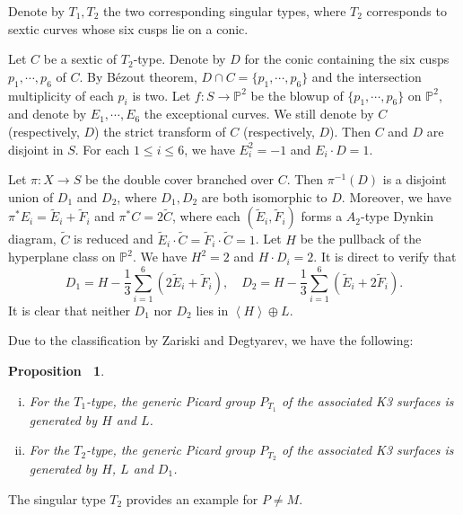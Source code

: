 \documentclass[12pt,reqno,a4paper]{amsart}
\newtheorem{prop}[thm]{Proposition~}
\theoremstyle{remark}
\theoremstyle{definition}
\begin{document}
Denote by $T_1,T_2$ the two corresponding singular types, where $T_2$ corresponds to sextic curves whose six cusps lie on a conic.

Let $C$ be a sextic of $T_2$-type.
Denote by $D$ for the conic containing the six cusps $p_1,\cdots,p_6$ of $C$.
By B\'ezout theorem, $D\cap C = \{ p_1,\cdots,p_6 \}$ and the intersection multiplicity of each $p_i$ is two.
Let $f\colon S\to \mathbb{P}^2$ be the blowup of $\{ p_1,\cdots,p_6 \}$ on $\mathbb{P}^2$, and denote by $E_1,\cdots,E_6$ the exceptional curves.
We still denote by $C$ (respectively, $D$) the strict transform of $C$ (respectively, $D$).
Then $C$ and $D$ are disjoint in $S$.
For each $1\le i\le 6$, we have $E_i^2=-1$ and $E_i\cdot D=1$.

Let $\pi\colon X\to S$ be the double cover branched over $C$.
Then $\pi^{-1}(D)$ is a disjoint union of $D_1$ and $D_2$, where $D_1,D_2$ are both isomorphic to $D$.
Moreover, we have $\pi^* E_i = \widetilde{E}_i + \widetilde{F}_i$ and $\pi^* C = 2 \widetilde{C}$, where each $(\widetilde{E}_i,\widetilde{F}_i)$ forms a $A_2$-type Dynkin diagram, $\widetilde{C}$ is reduced and $\widetilde{E}_i\cdot \widetilde{C} = \widetilde{F}_i\cdot \widetilde{C} = 1$.
Let $H$ be the pullback of the hyperplane class on $\mathbb{P}^2$.
We have $H^2=2$ and $H\cdot D_i=2$.
It is direct to verify that 
\begin{equation*}
    D_1 = H - \frac{1}{3}\sum_{i=1}^6 (2 \widetilde{E}_i + \widetilde{F}_i),\quad D_2 = H - \frac{1}{3}\sum_{i=1}^6 (\widetilde{E}_i + 2 \widetilde{F}_i).
\end{equation*}
It is clear that neither $D_1$ nor $D_2$ lies in $\left\langle H\right\rangle \oplus L$.

Due to the classification by Zariski and Degtyarev, we have the following:
\begin{prop}
\label{proposition: picard zariski pair}
\begin{enumerate}[(i)]
    \item For the $T_1$-type, the generic Picard group $P_{T_1}$ of the associated K3 surfaces is generated by $H$ and $L$.
    \item For the $T_2$-type, the generic Picard group $P_{T_2}$ of the associated K3 surfaces is generated by $H$, $L$ and $D_1$.
\end{enumerate}
\end{prop}
The singular type $T_2$ provides an example for $P\ne M$.
\end{document}
